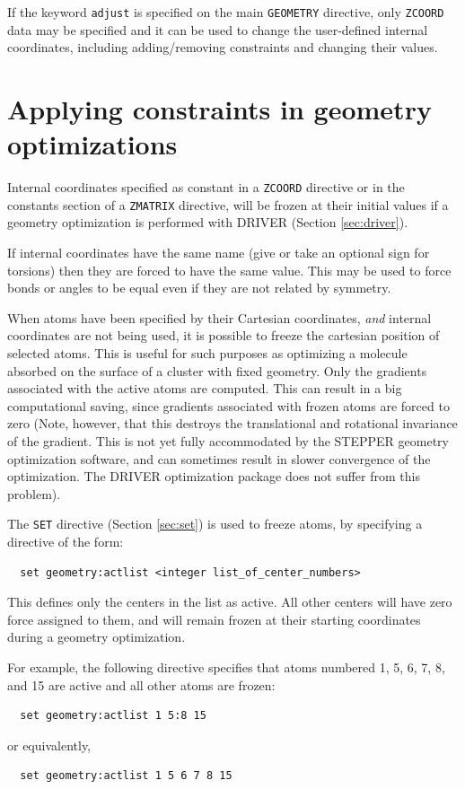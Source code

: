 If the keyword \verb+adjust+ is specified on the main \verb+GEOMETRY+
directive, only \verb+ZCOORD+ data may be specified and it can
be used to change the user-defined internal coordinates, including
adding/removing constraints and changing their values.

\section{Applying constraints in geometry optimizations}
\label{sec:activeatoms}
\label{sec:constraints}

Internal coordinates specified as constant in a \verb+ZCOORD+ directive
or in the constants section of a \verb+ZMATRIX+ directive, will be
frozen at their initial values if a geometry optimization is
performed with DRIVER (Section \ref{sec:driver}).

If internal coordinates have the same name (give or take 
an optional sign for torsions) then they are forced to have 
the same value.  This may be used to force bonds or angles to
be equal even if they are not related by symmetry.

When atoms have been specified by their Cartesian coordinates, {\em
and} internal coordinates are not being used, it is possible to freeze
the cartesian position of selected atoms.  This is useful for such
purposes as optimizing a molecule absorbed on the surface of a cluster
with fixed geometry.  Only the gradients associated with the active
atoms are computed.  This can result in a big computational saving,
since gradients associated with frozen atoms are forced to zero (Note,
however, that this destroys the translational and rotational
invariance of the gradient.  This is not yet fully accommodated by the
STEPPER geometry optimization software, and can sometimes result in
slower convergence of the optimization.  The DRIVER optimization
package does not suffer from this problem).

The \verb+SET+ directive (Section \ref{sec:set}) is used to freeze
atoms, by specifying a directive of the form:
\begin{verbatim}
  set geometry:actlist <integer list_of_center_numbers>
\end{verbatim}
This defines only the centers in the list as active.  All other
centers will have zero force assigned to them, and will remain frozen
at their starting coordinates during a geometry optimization.

For example, the following directive specifies that atoms numbered 1,
5, 6, 7, 8, and 15 are active and all other atoms are frozen:
\begin{verbatim}
  set geometry:actlist 1 5:8 15
\end{verbatim}
or equivalently,
\begin{verbatim}
  set geometry:actlist 1 5 6 7 8 15
\end{verbatim}

